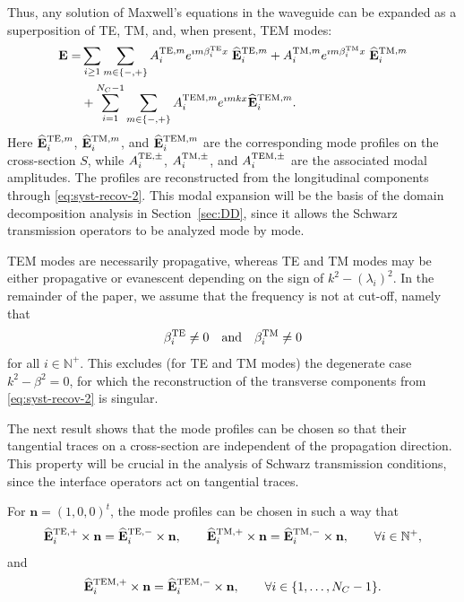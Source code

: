 \documentclass[smallextended]{svjour3}       %
\newcommand{\bfE}{{\mathbf{E}}}
\newcommand{\N}{\mathbb{N}}
\begin{document}
Thus, any solution of Maxwell's equations in the waveguide can be expanded as a superposition of TE, TM, and, when present, TEM modes:
\begin{equation}\label{modal-dec}
	\begin{split}
	\bfE = & \sum_{i \geq 1} \sum_{m \in \{-,+\}} A^{{\rm TE},m}_i e^{\imath m \beta_i^{\rm TE} x}\; \widehat{\bfE}^{{\rm TE},m}_i + A^{{\rm TM},m}_i e^{\imath m \beta_i^{\rm TM} x} \;\widehat{\bfE}^{{\rm TM},m}_i\\
		 & + \sum_{i = 1}^{N_C-1} \sum_{m \in \{-,+\}} A^{{\rm TEM},m}_i e^{\imath m k x} \widehat{\bfE}^{{\rm TEM},m}_i.
	\end{split}	 
\end{equation}	
Here $\widehat{\bfE}_i^{{\rm TE},m}$, $\widehat{\bfE}_i^{{\rm TM},m}$, and $\widehat{\bfE}_i^{{\rm TEM},m}$ are the corresponding mode profiles on the cross-section $S$, while $A_i^{{\rm TE},\pm}$, $A_i^{{\rm TM},\pm}$, and $A_i^{{\rm TEM},\pm}$ are the associated modal amplitudes. The profiles are reconstructed from the longitudinal components through \eqref{eq:syst-recov-2}. This modal expansion will be the basis of the domain decomposition analysis in Section~\ref{sec:DD}, since it allows the Schwarz transmission operators to be analyzed mode by mode.


\begin{remark}
TEM modes are necessarily propagative, whereas TE and TM modes may be either propagative or evanescent depending on the sign of $k^2-(\lambda_i)^2$. In the remainder of the paper, we assume that the frequency is not at cut-off, namely that
\[
\beta_i^{\rm TE}\neq 0 \quad \text{and} \quad \beta_i^{\rm TM}\neq 0
\]
for all $i \in \N^+$. This excludes (for TE and TM modes) the degenerate case $k^2-\beta^2=0$, for which the reconstruction of the transverse components from \eqref{eq:syst-recov-2} is singular.
\end{remark}

The next result shows that the mode profiles can be chosen so that their tangential traces on a cross-section are independent of the propagation direction. This property will be crucial in the analysis of Schwarz transmission conditions, since the interface operators act on tangential traces.

\begin{proposition}\label{prop:non-depend-pm}
For $\mathbf n=(1,0,0)^t$, the mode profiles can be chosen in such a way that
\[
\widehat{\bfE}^{\rm TE,+}_i\times \mathbf n
=
\widehat{\bfE}^{\rm TE,-}_i\times \mathbf n,
\qquad
\widehat{\bfE}^{\rm TM,+}_i\times \mathbf n
=
\widehat{\bfE}^{\rm TM,-}_i\times \mathbf n,
\qquad
\forall i\in\mathbb N^+,
\]
and
\[
\widehat{\bfE}^{\rm TEM,+}_i\times \mathbf n
=
\widehat{\bfE}^{\rm TEM,-}_i\times \mathbf n,
\qquad
\forall i\in\{1,\dots,N_C-1\}.
\]
\end{proposition}
\end{document}
